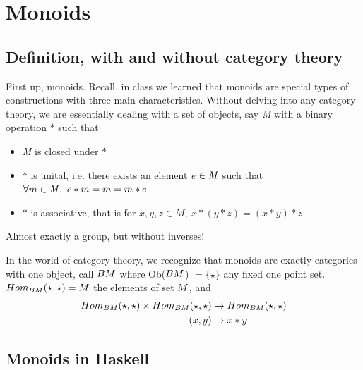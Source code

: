 \chapter{Monoids}
\section{Definition, with and without category theory}
First up, monoids. Recall, in class we learned that monoids are special types of constructions with three main characteristics. Without delving into any category theory, we are essentially dealing with a set of objects, say {\it M} with a binary operation $\ast$ such that
    \begin{itemize}
        \item {\it M} is closed under $\ast$
        \item $\ast$ is unital, i.e. there exists an element {\it e} $\in {\it M}$ such that $\forall m \in {\it M},~ e\ast m = m = m \ast e$
        \item $\ast$ is associative, that is for $x,y,z \in M,~ x\ast (y\ast z) = (x \ast y) \ast z$
    \end{itemize}
Almost exactly a group, but without inverses!

\hfill

In the world of category theory, we recognize that monoids are exactly categories with one object, call $\mathnormal{BM}$ where Ob($\mathnormal{BM}$) $=\{ \star \}$ any fixed one point set. $Hom_{\mathnormal{BM}}(\star, \star) = \mathnormal{M}$ the elements of set $\mathnormal{M}$, and 
\begin{align*}
    Hom_{\mathnormal{BM}}(\star, \star) \times Hom_{\mathnormal{BM}}(\star, \star) &\rightarrow Hom_{\mathnormal{BM}}(\star, \star) \\
    (x,y) &\mapsto x \ast y
\end{align*}

\section{Monoids in Haskell}

